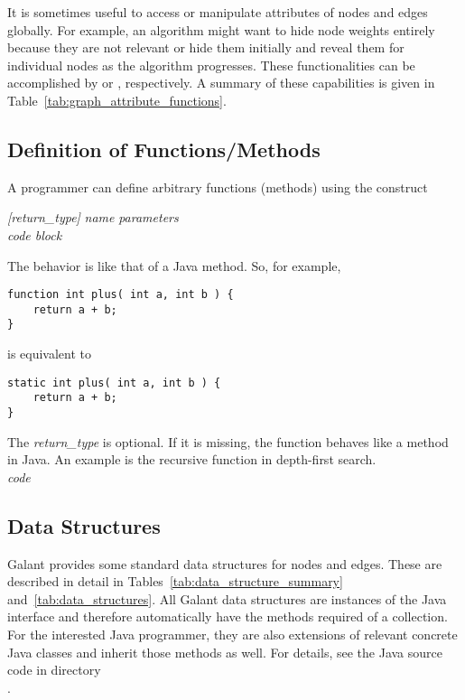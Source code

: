 

It is sometimes useful to access or manipulate attributes of nodes and edges
globally.
For example, an algorithm might want to hide node weights entirely
because they are not relevant
or hide them initially and reveal them for individual nodes as
the algorithm progresses.
These functionalities can be accomplished by
 or , respectively.
A summary of these capabilities is given in Table~\ref{tab:graph_attribute_functions}.

\subsection{Definition of Functions/Methods}\label{sec:functions}

A programmer can define arbitrary functions (methods) using the construct

 \textsl{[return\_type]} \textsl{name} \Code{(}
 \textsl{parameters} \Code{) \{} \\
 \hspace*{3em} \emph{code block} \\
 \Code{\}}

The behavior is like that of a Java method. So, for example,
\begin{verbatim}
function int plus( int a, int b ) {
    return a + b;
}
\end{verbatim}
is equivalent to
\begin{verbatim}
static int plus( int a, int b ) {
    return a + b;
}
\end{verbatim}

The \textsl{return\_type} is optional. If it is missing, the function behaves like
a  method in Java. An example is the recursive function
 in depth-first search.
\\
 \textsl{code} \Code{\}}





\subsection{Data Structures} \label{sec:datastructures}

Galant provides some standard data structures for nodes and edges.
These are described in detail in Tables~\ref{tab:data_structure_summary}
and~\ref{tab:data_structures}.
All Galant data structures are instances of the Java 
interface and therefore automatically have the methods required of a
collection. For the interested Java programmer, they are also extensions of
relevant concrete Java classes and inherit those methods as well. For
details, see the Java source code in directory\\
.


